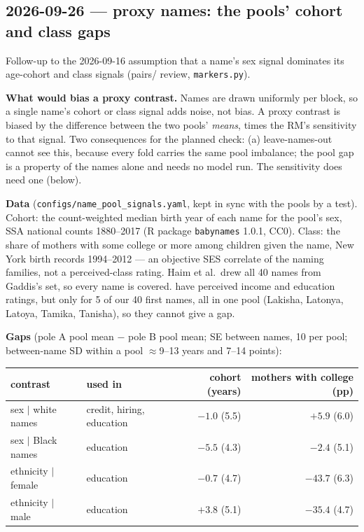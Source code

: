 \documentclass{article}
\begin{document}

\subsection*{2026-09-26 --- proxy names: the pools' cohort and class gaps}
Follow-up to the 2026-09-16 assumption that a name's sex signal dominates its age-cohort and class signals
(pairs/ review, \texttt{markers.py}).

\textbf{What would bias a proxy contrast.} Names are drawn uniformly per block, so a single name's cohort or class
signal adds noise, not bias. A proxy contrast is biased by the difference between the two pools' \emph{means},
times the RM's sensitivity to that signal. Two consequences for the planned check: (a) leave-names-out cannot see
this, because every fold carries the same pool imbalance; the pool gap is a property of the names alone and needs
no model run. The sensitivity does need one (below).

\textbf{Data} (\texttt{configs/name\_pool\_signals.yaml}, kept in sync with the pools by a test). Cohort: the
count-weighted median birth year of each name for the pool's sex, SSA national counts 1880--2017 (R package
\texttt{babynames} 1.0.1, CC0). Class: the share of mothers with some college or more among children given the
name, New York birth records 1994--2012 \citep[][supplement, Table~A1]{gaddis2017lakisha} --- an objective SES
correlate of the naming families, not a perceived-class rating. Haim et al.\ drew all 40 names from Gaddis's set,
so every name is covered. \citet{crabtree2023validated} have perceived income and education ratings, but only for
5 of our 40 first names, all in one pool (Lakisha, Latonya, Latoya, Tamika, Tanisha), so they cannot give a gap.

\textbf{Gaps} (pole A pool mean $-$ pole B pool mean; SE between names, 10 per pool; between-name SD within a pool
$\approx$9--13 years and 7--14 points):
\begin{center}\small
\begin{tabular}{llrr}
  \toprule
  contrast & used in & cohort (years) & mothers with college (pp) \\
  \midrule
  sex $\mid$ white names   & credit, hiring, education & $-1.0$ (5.5) & $+5.9$ (6.0) \\
  sex $\mid$ Black names   & education                 & $-5.5$ (4.3) & $-2.4$ (5.1) \\
  ethnicity $\mid$ female  & education                 & $-0.7$ (4.7) & $\mathbf{-43.7}$ (6.3) \\
  ethnicity $\mid$ male    & education                 & $+3.8$ (5.1) & $\mathbf{-35.4}$ (4.7) \\
  \bottomrule
\end{tabular}
\end{center}
\end{document}
